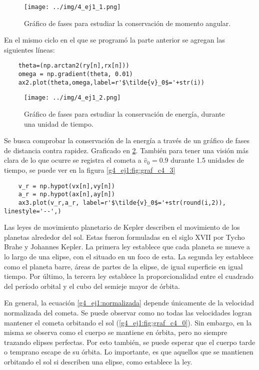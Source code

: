 \documentclass[../portafolio.tex]{subfiles}
\begin{document}
\begin{figure}
\centering
\texttt{[image: ../img/4\_ej1\_1.png]}
\caption{Gráfico de fases para estudiar la conservación de momento angular.} \label{g4_ej1:fig:graf_c4_1}
\end{figure}

En el mismo ciclo en el que se programó la parte anterior se agregan las siguientes líneas:
\begin{verbatim}
    theta=(np.arctan2(ry[n],rx[n]))
    omega = np.gradient(theta, 0.01)
    ax2.plot(theta,omega,label=r'$\tilde{v}_0$='+str(i))
\end{verbatim}

\begin{figure}
\centering
\texttt{[image: ../img/4\_ej1\_2.png]}
\caption{Gráfico de fases para estudiar la conservación de energía, durante una unidad de tiempo.} \label{g4_ej1:fig:graf_c4_2}
\end{figure}
Se busca comprobar la conservación de la energía a través de un gráfico de fases de distancia contra rapidez. Graficado en \ref{g4_ej1:fig:graf_c4_2}. También para tener una visión más clara de lo que ocurre se registra el cometa a $\tilde{v_0}=0.9$ durante 1.5 unidades de tiempo, se puede ver en la figura \ref{g4_ej1:fig:graf_c4_3}
\begin{verbatim}
    v_r = np.hypot(vx[n],vy[n])
    a_r = np.hypot(ax[n],ay[n])
    ax3.plot(v_r,a_r, label=r'$\tilde{v}_0$='+str(round(i,2)), linestyle='--',)
\end{verbatim}

Las leyes de movimiento planetario de Kepler \citep{openstaxfisica1} describen el movimiento de los planetas alrededor del sol. Estas fueron formuladas en el siglo XVII por Tycho Brahe y Johannes Kepler. La primera ley establece que cada planeta se mueve a lo largo de una elipse, con el situado en un foco de esta. La segunda ley establece como el planeta barre, áreas de partes de la elipse, de igual superficie en igual tiempo. Por último, la tercera ley establece la proporcionalidad entre el cuadrado del período orbital y el cubo del semieje mayor de órbita.

En general, la ecuación \eqref{g4_ej1:normalizada} depende únicamente de la velocidad normalizada del cometa. Se puede observar como no todas las velocidades logran mantener el cometa orbitando el sol (\ref{g4_ej1:fig:graf_c4_0}). Sin embargo, en la misma se observa como el cuerpo se mantiene en órbita, pero no siempre trazando elipses perfectas. Por esto también, se puede esperar que el cuerpo tarde o temprano escape de su órbita. Lo importante, es que aquellos que se mantienen orbitando el sol si describen una elipse, como establece la ley.
\end{document}
